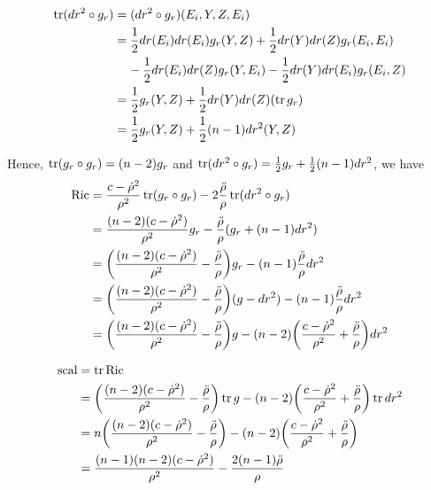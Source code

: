 \begin{align*}
	\operatorname{tr} (dr^2 \circ g_r)
	&= (dr^2 \circ g_r)(E_i, Y, Z, E_i) \\
	&= \frac{1}{2} dr(E_i)dr(E_i) g_r(Y, Z) + \frac{1}{2} dr(Y) dr(Z) g_r(E_i, E_i) \\
	&\;\;\;\; - \frac{1}{2} dr(E_i) dr(Z) g_r(Y, E_i) - \frac{1}{2} dr(Y) dr(E_i) g_r(E_i, Z) \\
	&= \frac{1}{2} g_r(Y, Z) + \frac{1}{2} dr(Y) dr(Z) (\operatorname{tr} g_r) \\
	&= \frac{1}{2} g_r (Y, Z) + \frac{1}{2} (n-1) dr^2(Y, Z)
\end{align*}

Hence, $\operatorname{tr} (g_r \circ g_r) = (n-2) g_r$ and $\operatorname{tr} (dr^2 \circ g_r) = \frac{1}{2} g_r + \frac{1}{2} (n-1) dr^2$, we have
\begin{align*}
	\Ric 
	&= \frac{c - \dot{\rho}^2}{\rho^2} \tr(g_r \circ g_r ) - 2 \frac{\ddot{\rho}}{\rho} \tr(dr^2 \circ g_r) \\
	&= \frac{(n-2)(c - \dot{\rho}^2)}{\rho^2}  g_r - \frac{\ddot{\rho}}{\rho} (g_r + (n-1) dr^2) \\
	&= \tuple*{\frac{(n-2)(c - \dot{\rho}^2)}{\rho^2}  - \frac{\ddot{\rho}}{\rho}} g_r - (n-1) \frac{\ddot{\rho}}{\rho} dr^2 \\
	&= \tuple*{\frac{(n-2)(c - \dot{\rho}^2)}{\rho^2}  - \frac{\ddot{\rho}}{\rho}} (g - dr^2) - (n-1) \frac{\ddot{\rho}}{\rho} dr^2 \\
	&= \tuple*{\frac{(n-2)(c - \dot{\rho}^2)}{\rho^2}  - \frac{\ddot{\rho}}{\rho}} g - (n-2) \tuple*{\frac{c - \dot{\rho}^2}{\rho^2}  + \frac{\ddot{\rho}}{\rho}} dr^2
\end{align*}



\begin{align*}
	\scal
	&= \tr \Ric \\
	&= \tuple*{\frac{(n-2)(c - \dot{\rho}^2)}{\rho^2}  - \frac{\ddot{\rho}}{\rho}} \tr g - (n-2) \tuple*{\frac{c - \dot{\rho}^2}{\rho^2}  + \frac{\ddot{\rho}}{\rho}} \tr dr^2 \\
	&= n \tuple*{\frac{(n-2)(c - \dot{\rho}^2)}{\rho^2}  - \frac{\ddot{\rho}}{\rho}}- (n-2) \tuple*{\frac{c - \dot{\rho}^2}{\rho^2}  + \frac{\ddot{\rho}}{\rho}} \\
	&= \frac{(n-1)(n-2)(c - \dot{\rho}^2)}{\rho^2} - \frac{2(n-1) \ddot{\rho}}{\rho}
\end{align*}

